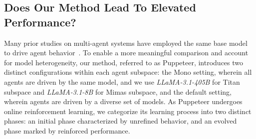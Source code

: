 \documentclass{article}
\begin{document}
\subsection{Does Our Method Lead To Elevated Performance?}
Many prior studies on multi-agent systems have employed the same base model to drive agent behavior~\cite{qian2024chatdevcommunicativeagentssoftware,liu2024dynamicllmpoweredagentnetwork,zhuge2024languageagentsoptimizablegraphs}. To enable a more meaningful comparison and account for model heterogeneity, our method, referred to as Puppeteer, introduces two distinct configurations within each agent subspace: the Mono setting, wherein all agents are driven by the same model, and we use \emph{LLaMA-3.1-405B} for Titan subspace and \emph{LLaMA-3.1-8B} for Mimas subspace, and the default setting, wherein agents are driven by a diverse set of models.
As Puppeteer undergoes online reinforcement learning, we categorize its learning process into two distinct phases: an initial phase characterized by unrefined behavior, and an evolved phase marked by reinforced performance.
\end{document}
